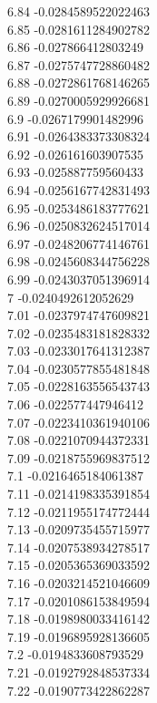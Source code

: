 {6.84	-0.0284589522022463\\
6.85	-0.0281611284902782\\
6.86	-0.027866412803249\\
6.87	-0.0275747728860482\\
6.88	-0.0272861768146265\\
6.89	-0.0270005929926681\\
6.9	-0.0267179901482996\\
6.91	-0.0264383373308324\\
6.92	-0.026161603907535\\
6.93	-0.025887759560433\\
6.94	-0.0256167742831493\\
6.95	-0.0253486183777621\\
6.96	-0.0250832624517014\\
6.97	-0.0248206774146761\\
6.98	-0.0245608344756228\\
6.99	-0.0243037051396914\\
7	-0.0240492612052629\\
7.01	-0.0237974747609821\\
7.02	-0.0235483181828332\\
7.03	-0.0233017641312387\\
7.04	-0.0230577855481848\\
7.05	-0.0228163556543743\\
7.06	-0.022577447946412\\
7.07	-0.0223410361940106\\
7.08	-0.0221070944372331\\
7.09	-0.0218755969837512\\
7.1	-0.0216465184061387\\
7.11	-0.0214198335391854\\
7.12	-0.0211955174772444\\
7.13	-0.0209735455715977\\
7.14	-0.0207538934278517\\
7.15	-0.0205365369033592\\
7.16	-0.0203214521046609\\
7.17	-0.0201086153849594\\
7.18	-0.0198980033416142\\
7.19	-0.0196895928136605\\
7.2	-0.0194833608793529\\
7.21	-0.0192792848537334\\
7.22	-0.0190773422862287\\
}
